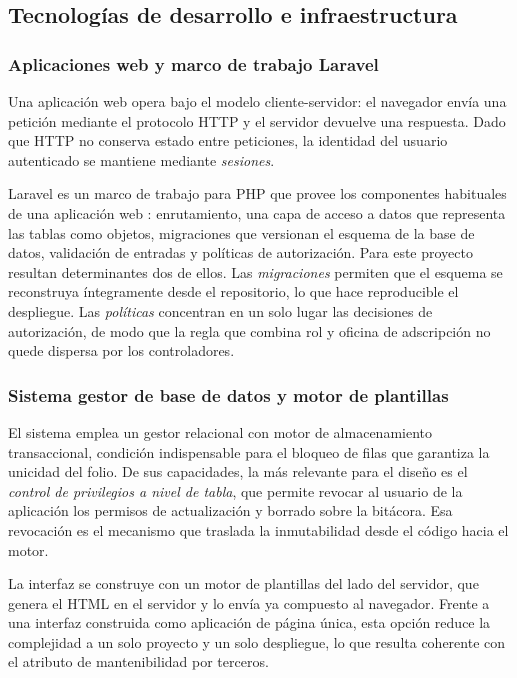 \subsection{Tecnologías de desarrollo e infraestructura}
\label{subsec:mt_tecnologias}

\subsubsection{Aplicaciones web y marco de trabajo Laravel}

Una aplicación web opera bajo el modelo cliente-servidor: el navegador envía una petición mediante el protocolo HTTP y el servidor devuelve una respuesta. Dado que HTTP no conserva estado entre peticiones, la identidad del usuario autenticado se mantiene mediante \emph{sesiones}.

Laravel es un marco de trabajo para PHP que provee los componentes habituales de una aplicación web \cite{laraveldocs}: enrutamiento, una capa de acceso a datos que representa las tablas como objetos, migraciones que versionan el esquema de la base de datos, validación de entradas y políticas de autorización. Para este proyecto resultan determinantes dos de ellos. Las \emph{migraciones} permiten que el esquema se reconstruya íntegramente desde el repositorio, lo que hace reproducible el despliegue. Las \emph{políticas} concentran en un solo lugar las decisiones de autorización, de modo que la regla que combina rol y oficina de adscripción no quede dispersa por los controladores.

\subsubsection{Sistema gestor de base de datos y motor de plantillas}

El sistema emplea un gestor relacional con motor de almacenamiento transaccional, condición indispensable para el bloqueo de filas que garantiza la unicidad del folio. De sus capacidades, la más relevante para el diseño es el \emph{control de privilegios a nivel de tabla}, que permite revocar al usuario de la aplicación los permisos de actualización y borrado sobre la bitácora. Esa revocación es el mecanismo que traslada la inmutabilidad desde el código hacia el motor.

La interfaz se construye con un motor de plantillas del lado del servidor, que genera el HTML en el servidor y lo envía ya compuesto al navegador. Frente a una interfaz construida como aplicación de página única, esta opción reduce la complejidad a un solo proyecto y un solo despliegue, lo que resulta coherente con el atributo de mantenibilidad por terceros.

